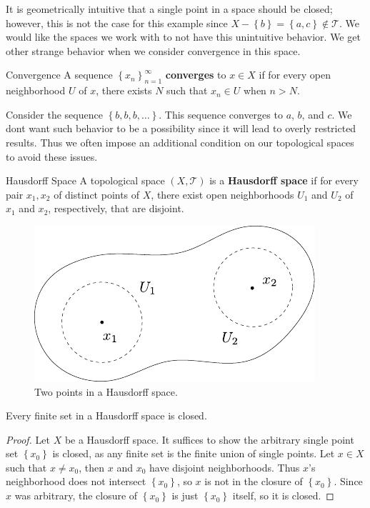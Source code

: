 \documentclass[10pt]{report}
\begin{document}
It is geometrically intuitive that a single point in a space should be closed; however, this is not the case for this example since $X - \left\{ b \right\} = \left\{ a,c \right\} \not\in \mathcal{T}$. We would like the spaces we work with to not have this unintuitive behavior. We get other strange behavior when we consider convergence in this space.

\begin{defn}{Convergence}{}
A sequence $\left\{ x_n \right\}_{n=1}^\infty$ \textbf{converges} to $x \in X$ if for every open neighborhood $U$ of $x$, there exists $N$ such that $x_n \in U$ when $n > N$.
\end{defn}

Consider the sequence $\left\{ b,b,b,\dots \right\}$. This sequence converges to $a$, $b$, and $c$. We dont want such behavior to be a possibility since it will lead to overly restricted results. Thus we often impose an additional condition on our topological spaces to avoid these issues.

\begin{defn}{Hausdorff Space}{}
	A topological space $(X,\mathcal{T})$ is a \textbf{Hausdorff space} if for every pair $x_1,x_2$ of distinct points of $X$, there exist open neighborhoods $U_1$ and $U_2$ of $x_1$ and $x_2$, respectively, that are disjoint.
\end{defn}

\begin{figure}[H]
	\centering
	\includegraphics[scale=1]{fig/hausdorff.pdf}
	\caption{Two points in a Hausdorff space.}
\end{figure}


\begin{prop}
	Every finite set in a Hausdorff space is closed.
\end{prop}
\begin{proof}
	Let $X$ be a Hausdorff space. It suffices to show the arbitrary single point set $\left\{ x_0 \right\}$ is closed, as any finite set is the finite union of single points. Let $x \in X$ such that $x \neq x_0$, then $x$ and $x_0$ have disjoint neighborhoods. Thus $x$'s neighborhood does not intersect $\left\{ x_0 \right\}$, so $x$ is not in the closure of $\left\{ x_0 \right\}$. Since $x$ was arbitrary, the closure of $\left\{ x_0 \right\}$ is just $\left\{ x_0 \right\}$ itself, so it is closed.
\end{proof}
\end{document}
